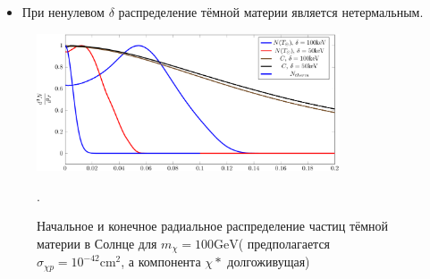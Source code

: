 \begin{itemize}
	\item При ненулевом $\delta$ распределение тёмной материи является нетермальным.
\end{itemize}
\begin{figure}[!h]
	\centering
	\includegraphics[width=0.8\textwidth]{images/Rdistribs.png}
	\caption{Начальное и конечное радиальное распределение частиц тёмной материи в Солнце для $m_{\chi} = 100\text{GeV}$( предполагается $\sigma_{\chi p} = 10^{-42} \text{cm}^2$, а компонента $\chi*$ долгоживущая)}.
	\label{plot:Nrdistrib}
\end{figure}
